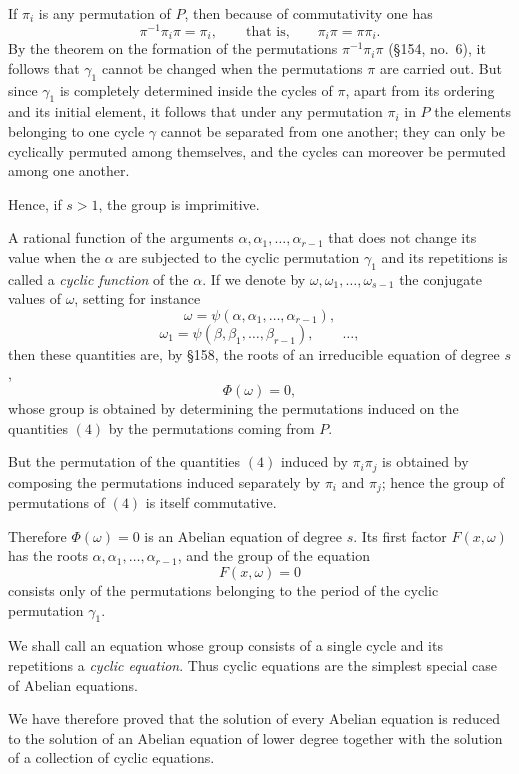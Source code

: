 \documentclass[11pt]{article}
\begin{document}
If $\pi_i$ is any permutation of $P$, then because of commutativity one has
\[
\pi^{-1}\pi_i\pi=\pi_i,
\qquad\text{that is,}\qquad
\pi_i\pi=\pi\pi_i.
\tag{3}
\]
By the theorem on the formation of the permutations $\pi^{-1}\pi_i\pi$ (\S 154, no.\ 6), it follows that $\gamma_1$ cannot be changed when the permutations $\pi$ are carried out. But since $\gamma_1$ is completely determined inside the cycles of $\pi$, apart from its ordering and its initial element, it follows that under any permutation $\pi_i$ in $P$ the elements belonging to one cycle $\gamma$ cannot be separated from one another; they can only be cyclically permuted among themselves, and the cycles can moreover be permuted among one another.

Hence, if $s>1$, the group is imprimitive.

A rational function of the arguments $\alpha,\alpha_1,\dots,\alpha_{r-1}$ that does not change its value when the $\alpha$ are subjected to the cyclic permutation $\gamma_1$ and its repetitions is called a \emph{cyclic function} of the $\alpha$. If we denote by $\omega,\omega_1,\dots,\omega_{s-1}$ the conjugate values of $\omega$, setting for instance
\[
\omega=\psi(\alpha,\alpha_1,\dots,\alpha_{r-1}),
\]
\[
\omega_1=\psi(\beta,\beta_1,\dots,\beta_{r-1}),
\qquad\dots,
\tag{4}
\]
then these quantities are, by \S 158, the roots of an irreducible equation of degree $s$,
\[
\Phi(\omega)=0,
\tag{5}
\]
whose group is obtained by determining the permutations induced on the quantities \((4)\) by the permutations coming from $P$.

But the permutation of the quantities \((4)\) induced by $\pi_i\pi_j$ is obtained by composing the permutations induced separately by $\pi_i$ and $\pi_j$; hence the group of permutations of \((4)\) is itself commutative.

Therefore $\Phi(\omega)=0$ is an Abelian equation of degree $s$. Its first factor $F(x,\omega)$ has the roots $\alpha,\alpha_1,\dots,\alpha_{r-1}$, and the group of the equation
\[
F(x,\omega)=0
\]
consists only of the permutations belonging to the period of the cyclic permutation $\gamma_1$.

We shall call an equation whose group consists of a single cycle and its repetitions a \emph{cyclic equation}. Thus cyclic equations are the simplest special case of Abelian equations.

We have therefore proved that the solution of every Abelian equation is reduced to the solution of an Abelian equation of lower degree together with the solution of a collection of cyclic equations.
\end{document}
